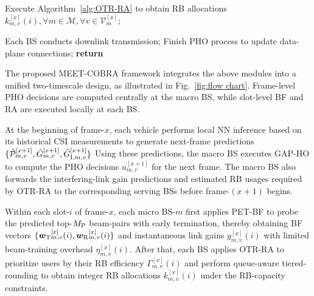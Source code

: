 \documentclass[conference, a4paper]{IEEEtran}
\newcommand{\rev}[1]{\textcolor{revisioncolor}{{}#1}}
\newif\ifshowdeletions
\newcommand{\currentdel}[1]{\ifshowdeletions\textcolor{deletioncolor}{\sout{#1}}\fi}
\theoremstyle{remark}
\begin{document}
\begin{algorithm}[htbp]
\begin{algorithmic}[1]
                    \STATE Execute Algorithm~\ref{alg:OTR-RA} to obtain RB allocations $k_{m,v}^{[x]}(i), \forall m \in \mathcal{M}, \forall v\in \mathcal{V}^{[x]}_m$;
                                
                    \STATE Each BS conducts downlink transmission;
                \ENDFOR
                \STATE Finish PHO process to update data-plane connections;
            \ENDFOR
            \STATE \textbf{return} 
        \end{algorithmic}
    \end{algorithm}
\fi

The proposed MEET-COBRA framework integrates the above modules into a unified two-timescale design, as illustrated in Fig.~\ref{fig:flow chart}.
Frame-level PHO decisions are computed centrally at the macro BS, while slot-level BF and RA are executed locally at each BS. 

At the beginning of frame-$x$, each vehicle performs local NN inference based on its historical CSI measurements to generate next-frame predictions $\{\Tilde{\mathcal{P}}_{m,v}^{[x+1]}, \Tilde{G}_{m,v}^{[x+1]}, \Tilde{G}_{{\rm I},m,v}^{[x+1]}\}$\currentdel{, which are reported to the macro BS through the control-plane uplink.} Using these predictions, the macro BS executes GAP-HO to compute the PHO decisions $u_{m,v}^{[x+1]}$ for the next frame. \rev{The macro BS also forwards the interfering-link gain predictions and estimated RB usages required by OTR-RA to the corresponding serving BSs before frame-$(x+1)$ begins.}

Within each slot-$i$ of frame-$x$, each micro BS-$m$ first applies PET-BF to probe the predicted top-$M_{\rm P}$ beam-pairs with early termination, thereby obtaining BF vectors $\{{\bm{w}_{\rm T}}_{m,v}^{[x]}(i), {\bm{w}_{\rm R}}_{m,v}^{[x]}(i)\}$ and instantaneous link gains $g_{m,v}^{[x]}(i)$ with limited beam-training overhead $\eta_{m,v}^{[x]}(i)$. 
After that, each BS applies OTR-RA to prioritize users by their RB efficiency $\Gamma_{m,v}^{[x]}(i)$ and perform queue-aware tiered-rounding to obtain integer RB allocations $k_{m,v}^{[x]}(i)$ under the RB-capacity constraints.
\end{document}
